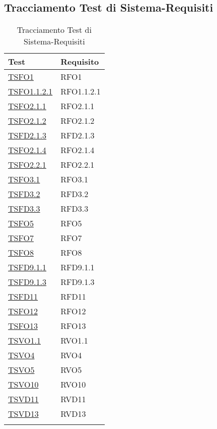 \subsection{Tracciamento Test di Sistema-Requisiti}
\normalsize
\begin{longtable}{|>{\centering}m{5cm}|m{5cm}<{\centering}|}
\hline 
\textbf{Test} & \textbf{Requisito}\\
\hline
\endhead
\hyperlink{TSFO1}{TSFO1} & RFO1\\ \hline
\hyperlink{TSFO1.1.2.1}{TSFO1.1.2.1} & RFO1.1.2.1\\ \hline
\hyperlink{TSFO2.1.1}{TSFO2.1.1} & RFO2.1.1\\ \hline
\hyperlink{TSFO2.1.2}{TSFO2.1.2} & RFO2.1.2\\ \hline
\hyperlink{TSFD2.1.3}{TSFD2.1.3} & RFD2.1.3\\ \hline
\hyperlink{TSFO2.1.4}{TSFO2.1.4} & RFO2.1.4\\ \hline
\hyperlink{TSFO2.2.1}{TSFO2.2.1} & RFO2.2.1\\ \hline
\hyperlink{TSFO3.1}{TSFO3.1} & RFO3.1\\ \hline
\hyperlink{TSFD3.2}{TSFD3.2} & RFD3.2\\ \hline
\hyperlink{TSFD3.3}{TSFD3.3} & RFD3.3\\ \hline
\hyperlink{TSFO5}{TSFO5} & RFO5\\ \hline
\hyperlink{TSFO7}{TSFO7} & RFO7\\ \hline
\hyperlink{TSFO8}{TSFO8} & RFO8\\ \hline
\hyperlink{TSFD9.1.1}{TSFD9.1.1} & RFD9.1.1\\ \hline
\hyperlink{TSFD9.1.3}{TSFD9.1.3} & RFD9.1.3\\ \hline
\hyperlink{TSFD11}{TSFD11} & RFD11\\ \hline
\hyperlink{TSFO12}{TSFO12} & RFO12\\ \hline
\hyperlink{TSFO13}{TSFO13} & RFO13\\ \hline
\hyperlink{TSVO1.1}{TSVO1.1} & RVO1.1\\ \hline
\hyperlink{TSVO4}{TSVO4} & RVO4\\ \hline
\hyperlink{TSVO5}{TSVO5} & RVO5\\ \hline
\hyperlink{TSVO10}{TSVO10} & RVO10\\ \hline
\hyperlink{TSVD11}{TSVD11} & RVD11\\ \hline
\hyperlink{TSVD13}{TSVD13} & RVD13\\ \hline
\caption[Tracciamento Test di Sistema-Requisiti]{Tracciamento Test di Sistema-Requisiti}
\label{tabella:ts-requi}
\end{longtable}
\clearpage

